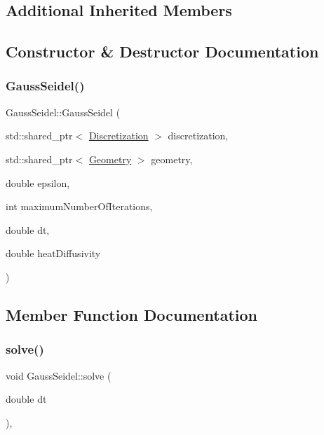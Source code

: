 \subsection*{Additional Inherited Members}


\subsection{Constructor \& Destructor Documentation}
\mbox{\label{classGaussSeidel_a65c96c3cedc1a2d0a50ed0e2104ec290}} 
\subsubsection{\texorpdfstring{GaussSeidel()}{GaussSeidel()}}
{\footnotesize\ttfamily Gauss\+Seidel\+::\+Gauss\+Seidel (\begin{DoxyParamCaption}\item[{std\+::shared\+\_\+ptr$<$ \mbox{\hyperlink{classDiscretization}{Discretization}} $>$}]{discretization,  }\item[{std\+::shared\+\_\+ptr$<$ \mbox{\hyperlink{classGeometry}{Geometry}} $>$}]{geometry,  }\item[{double}]{epsilon,  }\item[{int}]{maximum\+Number\+Of\+Iterations,  }\item[{double}]{dt,  }\item[{double}]{heat\+Diffusivity }\end{DoxyParamCaption})}



\subsection{Member Function Documentation}
\mbox{\label{classGaussSeidel_a171c7ffb638a311696c2c62b737d45d0}} 
\subsubsection{\texorpdfstring{solve()}{solve()}}
{\footnotesize\ttfamily void Gauss\+Seidel\+::solve (\begin{DoxyParamCaption}\item[{double}]{dt }\end{DoxyParamCaption})\hspace{0.3cm}{\ttfamily [override]}, {\ttfamily [virtual]}}



